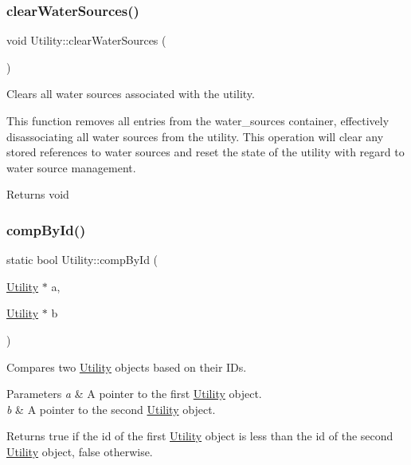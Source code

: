 \subsubsection{\texorpdfstring{clear\+Water\+Sources()}{clearWaterSources()}}
{\footnotesize\ttfamily void Utility\+::clear\+Water\+Sources (\begin{DoxyParamCaption}{ }\end{DoxyParamCaption})}



Clears all water sources associated with the utility. 

This function removes all entries from the water\+\_\+sources container, effectively disassociating all water sources from the utility. This operation will clear any stored references to water sources and reset the state of the utility with regard to water source management.

\begin{DoxyReturn}{Returns}
void 
\end{DoxyReturn}
\mbox{\label{classUtility_a360c97e7dd372f3ff57f94314743e53d}} 
\subsubsection{\texorpdfstring{comp\+By\+Id()}{compById()}}
{\footnotesize\ttfamily static bool Utility\+::comp\+By\+Id (\begin{DoxyParamCaption}\item[{\mbox{\hyperlink{classUtility}{Utility}} $\ast$}]{a,  }\item[{\mbox{\hyperlink{classUtility}{Utility}} $\ast$}]{b }\end{DoxyParamCaption})\hspace{0.3cm}{\ttfamily [static]}}



Compares two \mbox{\hyperlink{classUtility}{Utility}} objects based on their I\+Ds. 


\begin{DoxyParams}{Parameters}
{\em a} & A pointer to the first \mbox{\hyperlink{classUtility}{Utility}} object. \\
\hline
{\em b} & A pointer to the second \mbox{\hyperlink{classUtility}{Utility}} object.\\
\hline
\end{DoxyParams}
\begin{DoxyReturn}{Returns}
true if the id of the first \mbox{\hyperlink{classUtility}{Utility}} object is less than the id of the second \mbox{\hyperlink{classUtility}{Utility}} object, false otherwise. 
\end{DoxyReturn}
\mbox{\label{classUtility_a7daa5b948a370eca83bc8c63890f6b19}} 
